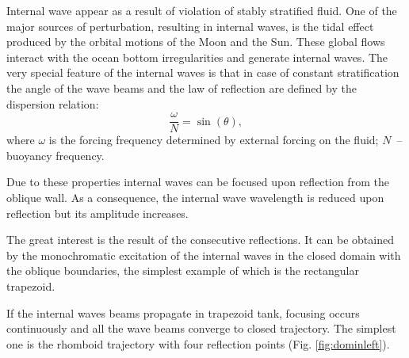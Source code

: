 \documentclass[a4wide,fontsize=12pt]{article}
\begin{document}
Internal wave appear as a result of violation of stably stratified fluid. 
One of the major sources of perturbation, resulting in internal waves, is the tidal effect produced by the orbital motions of the Moon and the Sun. These global flows interact with the ocean bottom irregularities and generate internal waves. The very special feature of the internal waves is that in case of constant stratification the angle of the wave beams and the law of reflection are defined by the dispersion relation:
$$\frac{\omega}{N} = \sin(\theta),$$
where $\omega$ is the forcing frequency determined by external forcing on the fluid; 
$N$~-- buoyancy frequency.


Due to these properties internal waves can be focused upon reflection from the oblique wall. As a consequence,  the internal wave wavelength is reduced upon reflection but its amplitude increases.


The great interest is the result of the consecutive reflections. It can be obtained by the monochromatic excitation of the internal waves in the closed domain with the oblique boundaries, the simplest example of which is the rectangular trapezoid.

If the internal waves beams propagate in trapezoid tank, focusing occurs continuously and all the wave beams converge to closed trajectory. The simplest one is the rhomboid trajectory with four reflection points (Fig. \ref{fig:dominleft}).
\end{document}
